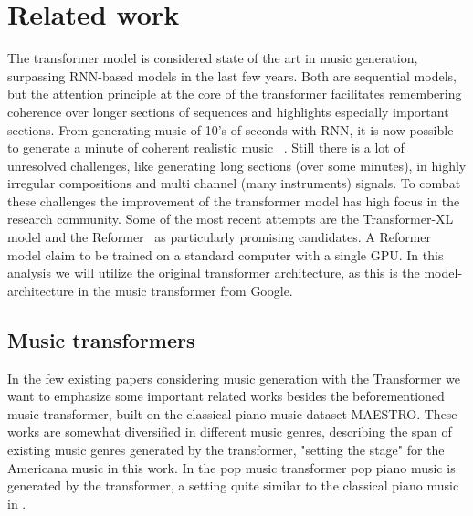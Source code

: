 \documentclass{IEEEtran}
\begin{document}
    \section{Related work}
       The transformer model is considered state of the art in music generation,
       surpassing RNN-based models in the last few years. Both are sequential models,
       but the attention principle at the core of the transformer facilitates
       remembering coherence over longer sections of sequences and highlights
       especially important sections. From generating music of 10's of seconds with RNN, it is now possible to generate a minute of coherent realistic music ~\cite{huang2018music}. Still there is a lot of unresolved challenges, like generating long sections (over some minutes), in highly irregular compositions
       and multi channel (many instruments) signals. To combat these challenges the
       improvement of the transformer model has high focus in the research community.
       Some of the most recent attempts are the Transformer-XL~\cite{dai2019transformerxl} 
       model and the Reformer~\cite{kitaev2020reformer} as particularly promising
       candidates.
       A Reformer model claim to be trained on a standard computer with a single GPU.
       In this analysis we will utilize the original transformer architecture, as this
       is the model-architecture in the music transformer from Google.

       \subsection{Music transformers}
       In the few existing papers considering music generation with the Transformer
       we want to emphasize some important related works besides the beforementioned
       music transformer, built on the classical piano music dataset MAESTRO.
       These works are somewhat diversified in different music genres, describing the span of existing music genres generated by the transformer, "setting the stage" for the Americana music in this work. In the pop
       music transformer \cite{huang2020pop} pop piano music is generated by the
       transformer, a setting quite similar to the classical piano music in \cite{huang2018music}. 
\end{document}
